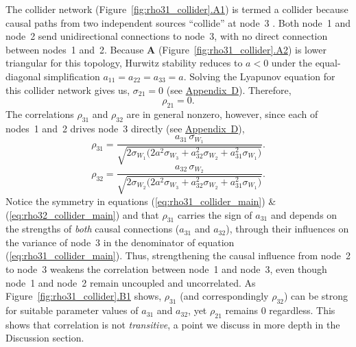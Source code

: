 \documentclass[12pt]{article}
\begin{document}
The collider network
(Figure~\ref{fig:rho31_collider}\hyperref[fig:collider_A1]{.A1})
is termed a collider because causal paths from two
independent sources ``collide'' at node~3 \citep{Pearl2009}.
Both node~1 and node~2 send unidirectional connections to node~3, with no direct connection
between nodes~1 and~2. Because
$\mathbf{A}$
(Figure~\ref{fig:rho31_collider}\hyperref[fig:collider_A2]{.A2})
is lower triangular for this topology,
Hurwitz stability reduces to $a<0$ under the equal-diagonal
simplification $a_{11}=a_{22}=a_{33}=a$.
Solving the Lyapunov equation for this collider network gives us, $\sigma_{21}=0$ (see
\hyperref[app:appD]{Appendix~D}). Therefore,
\begin{equation}
\rho_{21} = 0.
\label{eq:rho21_collider}
\end{equation}
The correlations $\rho_{31}$ and $\rho_{32}$ are in general
nonzero, however, since each of nodes~1 and~2 drives node~3
directly (see \hyperref[app:appD]{Appendix~D}),
\begin{equation}
\rho_{31} = \frac{a_{31}\,\sigma_{W_1}}
{\sqrt{2\sigma_{W_1}
  \bigl(2a^2\sigma_{W_3}+a_{32}^2\sigma_{W_2}
        +a_{31}^2\sigma_{W_1}\bigr)}}.
\label{eq:rho31_collider_main}
\end{equation}
\begin{equation}
\rho_{32} = \frac{a_{32}\,\sigma_{W_2}}
{\sqrt{2\sigma_{W_2}
  \bigl(2a^2\sigma_{W_3}+a_{32}^2\sigma_{W_2}
        +a_{31}^2\sigma_{W_1}\bigr)}}.
\label{eq:rho32_collider_main}
\end{equation}
Notice the symmetry in equations (\ref{eq:rho31_collider_main}) \& (\ref{eq:rho32_collider_main}) and that $\rho_{31}$ carries the sign of $a_{31}$ and
depends on the strengths of \emph{both} causal connections
($a_{31}$ and $a_{32}$), through their influences on
the variance of node~3 in the denominator of equation (\ref{eq:rho31_collider_main}).
Thus, strengthening the causal influence from node~2 to
node~3 weakens the correlation between node~1 and node~3,
even though node~1 and node~2 remain uncoupled and
uncorrelated.
As Figure~\ref{fig:rho31_collider}\hyperref[fig:collider_B1]{.B1}
shows, $\rho_{31}$ (and
correspondingly $\rho_{32}$) can be strong for suitable
parameter values of $a_{31}$ and $a_{32}$, yet $\rho_{21}$ remains $0$ regardless.
This shows that correlation is not \emph{transitive}, a point
we discuss in more depth in the Discussion section.
\end{document}
